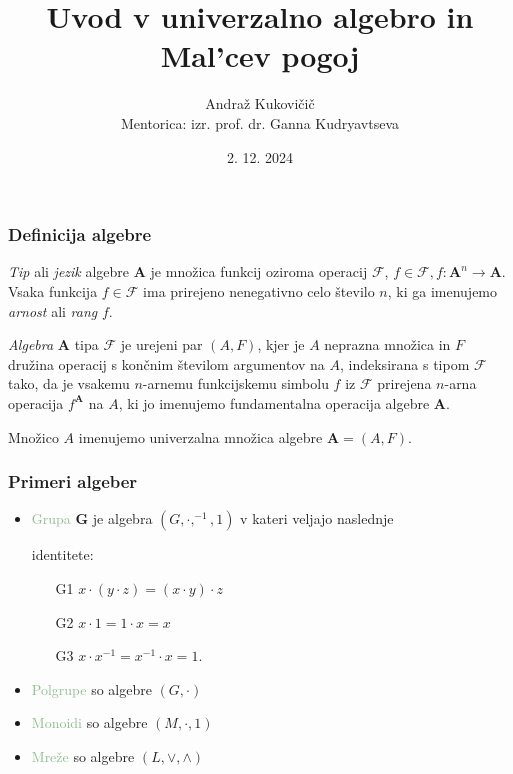 \documentclass{beamer}
\title{Uvod v univerzalno algebro in Mal'cev pogoj}
\author{Andraž Kukovičič \\ {\small Mentorica: izr. prof. dr. Ganna Kudryavtseva \\}}
\institute{Fakulteta za matematiko in fiziko}
\date{2. 12. 2024}
\newcommand{\FF}{$\mathcal{F}$ }
\begin{document}
\frame{\titlepage}

\begin{frame}
\frametitle{Definicija algebre}

\emph{Tip} ali \emph{jezik} algebre $\mathbf{A}$ je množica funkcij oziroma operacij $\mathcal{F}$,  $f \in \mathcal{F}, f:\mathbf{A}^n \rightarrow \mathbf{A}$.
Vsaka funkcija $f \in 
\mathcal{F}$ ima prirejeno nenegativno celo število $n$, ki ga imenujemo \emph{arnost} ali 
\emph{rang} $f$. \\
\pause
\begin{block}{}

\emph{Algebra} $\mathbf{A}$ tipa $\mathcal{F}$ je urejeni par $ \left(A, F\right)$, kjer je $A$ neprazna množica 
in $F$ družina operacij s končnim številom argumentov na $A$, indeksirana s tipom \FF tako, 
da je vsakemu $n$-arnemu funkcijskemu simbolu $f$ iz \FF prirejena $n$-arna operacija $f^\mathbf{A}$ 
na $A$, ki jo imenujemo fundamentalna operacija algebre $\mathbf{A}$. \\

\end{block}
\pause
Množico $A$ imenujemo univerzalna množica algebre $\mathbf{A}  = \left(A, F\right)$. \\
\end{frame}

\begin{frame}
    \frametitle{Primeri algeber}
    \begin{itemize}
        \item \textcolor{darkseagreen}{Grupa} $\mathbf{G}$ je algebra $\left(G, \cdot, ^{-1}, 1\right)$ v kateri veljajo naslednje
        \item[] identitete:
        \begin{itemize}
            \item[G1] $x \cdot \left(y \cdot z\right) = \left(x \cdot y\right) \cdot z$
            \item[G2] $x \cdot 1 = 1 \cdot x = x$
            \item[G3] $x \cdot x^{-1} = x^{-1} \cdot x = 1$.
        \end{itemize}
    \pause
        \item \textcolor{darkseagreen}{Polgrupe} so algebre $\left(G, \cdot\right)$
        \item \textcolor{darkseagreen}{Monoidi} so algebre  $\left(M, \cdot, 1\right)$
        \item \textcolor{darkseagreen}{Mreže} so algebre $\left(L,\vee, \wedge\right)$ 
    \end{itemize}
\end{frame}
\end{document}

